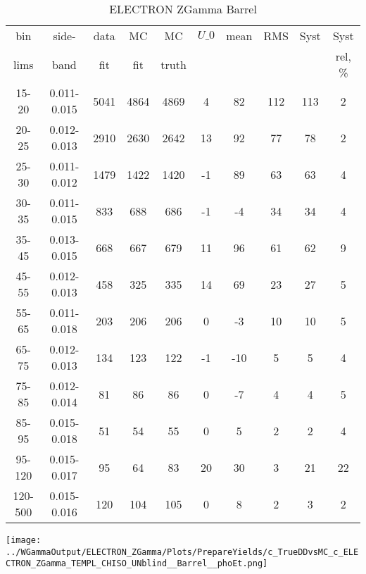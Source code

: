 \documentclass{beamer}
\begin{document}
\begin{frame}
{
\begin{table}[h]
  	\tiny
  \begin{center}
  \caption{ELECTRON ZGamma Barrel}
  \begin{tabular}{|c|c|c|c|c|c|c|c|c|c|}
    bin & side- & data & MC & MC    & $U\_{0}$ & mean & RMS & Syst & Syst \\ 
    lims & band & fit & fit & truth &       &      &     &      & rel, \% \\ \hline
    15-20 & 0.011-0.015 & 5041 & 4864 & 4869 & 4 & 82 & 112 & 113 & 2  \\ \hline
    20-25 & 0.012-0.013 & 2910 & 2630 & 2642 & 13 & 92 & 77 & 78 & 2  \\ \hline
    25-30 & 0.011-0.012 & 1479 & 1422 & 1420 & -1 & 89 & 63 & 63 & 4  \\ \hline
    30-35 & 0.011-0.015 & 833 & 688 & 686 & -1 & -4 & 34 & 34 & 4  \\ \hline
    35-45 & 0.013-0.015 & 668 & 667 & 679 & 11 & 96 & 61 & 62 & 9  \\ \hline
    45-55 & 0.012-0.013 & 458 & 325 & 335 & 14 & 69 & 23 & 27 & 5  \\ \hline
    55-65 & 0.011-0.018 & 203 & 206 & 206 & 0 & -3 & 10 & 10 & 5  \\ \hline
    65-75 & 0.012-0.013 & 134 & 123 & 122 & -1 & -10 & 5 & 5 & 4  \\ \hline
    75-85 & 0.012-0.014 & 81 & 86 & 86 & 0 & -7 & 4 & 4 & 5  \\ \hline
    85-95 & 0.015-0.018 & 51 & 54 & 55 & 0 & 5 & 2 & 2 & 4  \\ \hline
    95-120 & 0.015-0.017 & 95 & 64 & 83 & 20 & 30 & 3 & 21 & 22  \\ \hline
    120-500 & 0.015-0.016 & 120 & 104 & 105 & 0 & 8 & 2 & 3 & 2  \\ \hline
  \end{tabular}
  \label{tab:systSbVar_Meth1_ELECTRON_ZGamma_Barrel}
  \end{center}
\end{table}

\texttt{[image: ../WGammaOutput/ELECTRON\_ZGamma/Plots/PrepareYields/c\_TrueDDvsMC\_c\_ELECTRON\_ZGamma\_TEMPL\_CHISO\_UNblind\_\_Barrel\_\_phoEt.png]} 

}
\end{frame}
\end{document}

